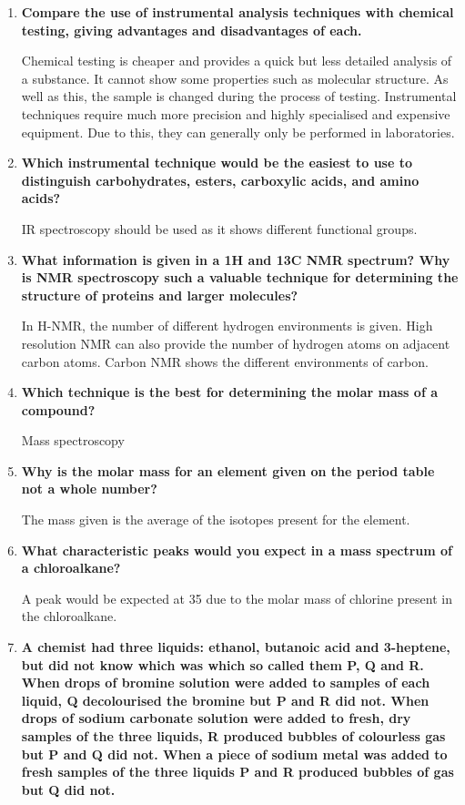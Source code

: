\documentclass{report}
\begin{document}
\begin{enumerate}
		\item \textbf{Compare the use of instrumental analysis techniques with chemical testing, giving advantages and disadvantages of each.}

			Chemical testing is cheaper and provides a quick but less detailed analysis of a substance. It cannot show some properties such as molecular structure. As well as this, the sample is changed during the process of testing. Instrumental techniques require much more precision and highly specialised and expensive equipment. Due to this, they can generally only be performed in laboratories.

		\item \textbf{Which instrumental technique would be the easiest to use to distinguish carbohydrates, esters, carboxylic acids, and amino acids?}

			IR spectroscopy should be used as it shows different functional groups.

		\item \textbf{What information is given in a 1H and 13C NMR spectrum? Why is NMR spectroscopy such a valuable technique for determining the structure of proteins and larger molecules?}

			In H-NMR, the number of different hydrogen environments is given. High resolution NMR can also provide the number of hydrogen atoms on adjacent carbon atoms. Carbon NMR shows the different environments of carbon.

		\item \textbf{Which technique is the best for determining the molar mass of a compound?}

			Mass spectroscopy

		\item \textbf{Why is the molar mass for an element given on the period table not a whole number?}

			The mass given is the average of the isotopes present for the element.

		\item \textbf{What characteristic peaks would you expect in a mass spectrum of a chloroalkane?}

			A peak would be expected at 35 due to the molar mass of chlorine present in the chloroalkane.

		\item \textbf{A chemist had three liquids: ethanol, butanoic acid and 3-heptene, but did not know which was which so called them P, Q and R. When drops of bromine solution were added to samples of each liquid, Q decolourised the bromine but P and R did not. When drops of sodium carbonate solution were added to fresh, dry samples of the three liquids, R produced bubbles of colourless gas but P and Q did not. When a piece of sodium metal was added to fresh samples of the three liquids P and R produced bubbles of gas but Q did not.}


\end{enumerate}
\end{document}
